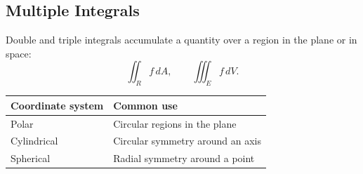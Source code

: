 \subsection*{Multiple Integrals}

\begin{definition*}
Double and triple integrals accumulate a quantity over a region in the plane
or in space:
\[
  \iint_R f\,dA,
  \qquad
  \iiint_E f\,dV.
\]
\end{definition*}

\begin{center}
\begin{tabular}{ll}
\toprule
Coordinate system & Common use \\
\midrule
Polar & Circular regions in the plane \\
Cylindrical & Circular symmetry around an axis \\
Spherical & Radial symmetry around a point \\
\bottomrule
\end{tabular}
\end{center}
